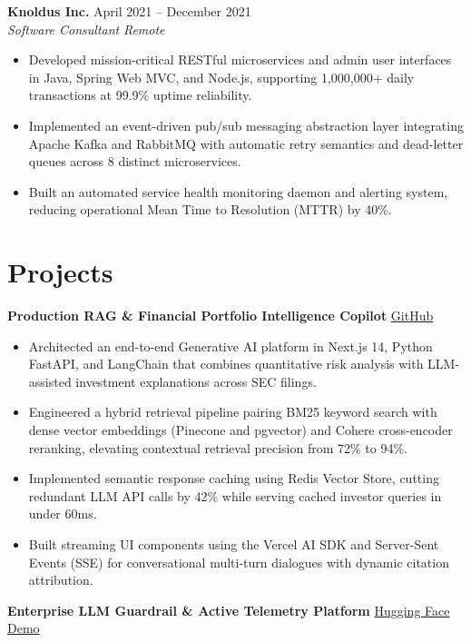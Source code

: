 \documentclass[10pt,a4paper]{article}
\newcommand{\jobheading}[4]{
  \textbf{#1} \hfill #2\\
  \textit{#3} \hfill \textit{#4}\\[-2pt]
}
\newcommand{\projectheading}[3]{
  \textbf{#1} \hfill
  \href{#2}{#3}\\[-2pt]
}
\begin{document}
\medskip

\jobheading
  {Knoldus Inc.}
  {April 2021 -- December 2021}
  {Software Consultant}
  {Remote}

\begin{itemize}
  \item Developed mission-critical RESTful microservices and admin user interfaces in Java, Spring Web MVC, and Node.js, supporting 1,000,000+ daily transactions at 99.9\% uptime reliability.
  \item Implemented an event-driven pub/sub messaging abstraction layer integrating Apache Kafka and RabbitMQ with automatic retry semantics and dead-letter queues across 8 distinct microservices.
  \item Built an automated service health monitoring daemon and alerting system, reducing operational Mean Time to Resolution (MTTR) by 40\%.
\end{itemize}


\section{Projects}

\projectheading
  {Production RAG \& Financial Portfolio Intelligence Copilot}
  {https://github.com/sakshi-labs/}
  {GitHub}

\begin{itemize}
  \item Architected an end-to-end Generative AI platform in Next.js 14, Python FastAPI, and LangChain that combines quantitative risk analysis with LLM-assisted investment explanations across SEC filings.
  \item Engineered a hybrid retrieval pipeline pairing BM25 keyword search with dense vector embeddings (Pinecone and pgvector) and Cohere cross-encoder reranking, elevating contextual retrieval precision from 72\% to 94\%.
  \item Implemented semantic response caching using Redis Vector Store, cutting redundant LLM API calls by 42\% while serving cached investor queries in under 60ms.
  \item Built streaming UI components using the Vercel AI SDK and Server-Sent Events (SSE) for conversational multi-turn dialogues with dynamic citation attribution.
\end{itemize}

\medskip

\projectheading
  {Enterprise LLM Guardrail \& Active Telemetry Platform}
  {https://huggingface.co/spaces/Sakshiii/}
  {Hugging Face Demo}
\end{document}
